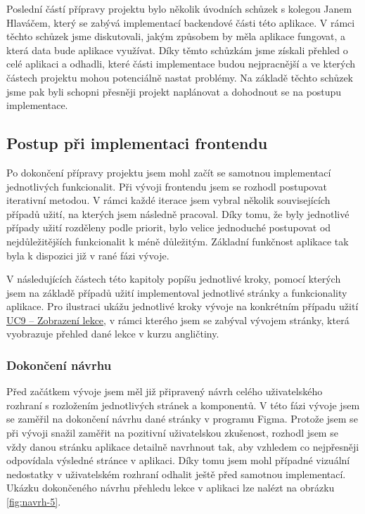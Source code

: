 Poslední částí přípravy projektu bylo několik úvodních schůzek s kolegou Janem Hlaváčem, který se zabývá implementací backendové části této aplikace. V rámci těchto schůzek jsme diskutovali, jakým způsobem by měla aplikace fungovat, a která data bude aplikace využívat. Díky těmto schůzkám jsme získali přehled o celé aplikaci a odhadli, které části implementace budou nejpracnější a ve kterých částech projektu mohou potenciálně nastat problémy. Na základě těchto schůzek jsme pak byli schopni přesněji projekt naplánovat a dohodnout se na postupu implementace.

\subsection{Postup při implementaci frontendu}

Po dokončení přípravy projektu jsem mohl začít se samotnou implementací jednotlivých funkcionalit. Při vývoji frontendu jsem se rozhodl postupovat iterativní metodou. V rámci každé iterace jsem vybral několik souvisejících případů užití, na kterých jsem následně pracoval. Díky tomu, že byly jednotlivé případy užití rozděleny podle priorit, bylo velice jednoduché postupovat od nejdůležitějších funkcionalit k méně důležitým. Základní funkčnost aplikace tak byla k dispozici již v rané fázi vývoje. 

V následujících částech této kapitoly popíšu jednotlivé kroky, pomocí kterých jsem na základě případů užití implementoval jednotlivé stránky a funkcionality aplikace. Pro ilustraci ukážu jednotlivé kroky vývoje na konkrétním případu užití \hyperref[sec:uc-lesson]{UC9 – Zobrazení lekce}, v rámci kterého jsem se zabýval vývojem stránky, která vyobrazuje přehled dané lekce v kurzu angličtiny.

\subsubsection{Dokončení návrhu}

Před začátkem vývoje jsem měl již připravený návrh celého uživatelského rozhraní s rozložením jednotlivých stránek a komponentů. V této fázi vývoje jsem se zaměřil na dokončení návrhu dané stránky v programu Figma. Protože jsem se při vývoji snažil zaměřit na pozitivní uživatelskou zkušenost, rozhodl jsem se vždy danou stránku aplikace detailně navrhnout tak, aby vzhledem co nejpřesněji odpovídala výsledné stránce v aplikaci. Díky tomu jsem mohl případné vizuální nedostatky v uživatelském rozhraní odhalit ještě před samotnou implementací. Ukázku dokončeného návrhu přehledu lekce v aplikaci lze nalézt na obrázku \ref{fig:navrh-5}.

